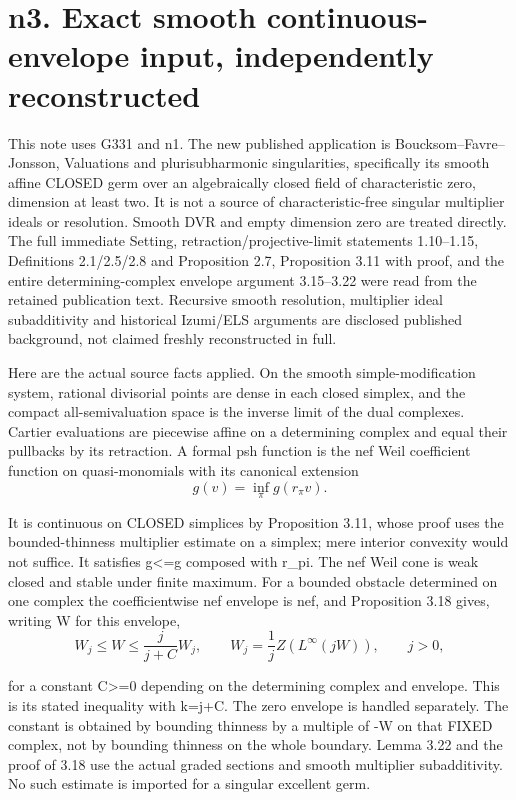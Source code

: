 \documentclass[11pt]{article}
\begin{document}
\section{n3. Exact smooth continuous-envelope input, independently reconstructed}

This note uses G331 and n1. The new published application is Boucksom--Favre--Jonsson, Valuations and plurisubharmonic singularities, specifically its smooth affine CLOSED germ over an algebraically closed field of characteristic zero, dimension at least two. It is not a source of characteristic-free singular multiplier ideals or resolution. Smooth DVR and empty dimension zero are treated directly. The full immediate Setting, retraction/projective-limit statements 1.10--1.15, Definitions 2.1/2.5/2.8 and Proposition 2.7, Proposition 3.11 with proof, and the entire determining-complex envelope argument 3.15--3.22 were read from the retained publication text. Recursive smooth resolution, multiplier ideal subadditivity and historical Izumi/ELS arguments are disclosed published background, not claimed freshly reconstructed in full.

Here are the actual source facts applied. On the smooth simple-modification system, rational divisorial points are dense in each closed simplex, and the compact all-semivaluation space is the inverse limit of the dual complexes. Cartier evaluations are piecewise affine on a determining complex and equal their pullbacks by its retraction. A formal psh function is the nef Weil coefficient function on quasi-monomials with its canonical extension
\[
g(v)=\inf_\pi g(r_\pi v).
\]

It is continuous on CLOSED simplices by Proposition 3.11, whose proof uses the bounded-thinness multiplier estimate on a simplex; mere interior convexity would not suffice. It satisfies g<=g composed with r\_pi. The nef Weil cone is weak closed and stable under finite maximum. For a bounded obstacle determined on one complex the coefficientwise nef envelope is nef, and Proposition 3.18 gives, writing W for this envelope,
\[
W_j\le W\le \frac{j}{j+C}W_j,
\qquad W_j=\frac1j Z(L^\infty(jW)),\qquad j>0,
\]

for a constant C>=0 depending on the determining complex and envelope. This is its stated inequality with k=j+C. The zero envelope is handled separately. The constant is obtained by bounding thinness by a multiple of -W on that FIXED complex, not by bounding thinness on the whole boundary. Lemma 3.22 and the proof of 3.18 use the actual graded sections and smooth multiplier subadditivity. No such estimate is imported for a singular excellent germ.
\end{document}
